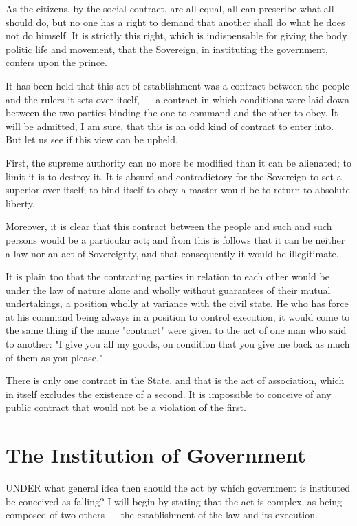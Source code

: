 \documentclass[12pt]{report}
\begin{document}
As the citizens, by the social contract, are all equal, all can prescribe what all should do, but no one has a right to demand that another shall do what he does not do himself. It is strictly this right, which is indispensable for giving the body politic life and movement, that the Sovereign, in instituting the government, confers upon the prince.

It has been held that this act of establishment was a contract between the people and the rulers it sets over itself, — a contract in which conditions were laid down between the two parties binding the one to command and the other to obey. It will be admitted, I am sure, that this is an odd kind of contract to enter into. But let us see if this view can be upheld.

First, the supreme authority can no more be modified than it can be alienated; to limit it is to destroy it. It is absurd and contradictory for the Sovereign to set a superior over itself; to bind itself to obey a master would be to return to absolute liberty.

Moreover, it is clear that this contract between the people and such and such persons would be a particular act; and from this is follows that it can be neither a law nor an act of Sovereignty, and that consequently it would be illegitimate.

It is plain too that the contracting parties in relation to each other would be under the law of nature alone and wholly without guarantees of their mutual undertakings, a position wholly at variance with the civil state. He who has force at his command being always in a position to control execution, it would come to the same thing if the name "contract" were given to the act of one man who said to another: "I give you all my goods, on condition that you give me back as much of them as you please."

There is only one contract in the State, and that is the act of association, which in itself excludes the existence of a second. It is impossible to conceive of any public contract that would not be a violation of the first.

\section{The Institution of Government}
UNDER what general idea then should the act by which government is instituted be conceived as falling? I will begin by stating that the act is complex, as being composed of two others — the establishment of the law and its execution.
\end{document}
